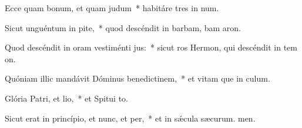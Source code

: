 \item Ecce quam bonum, et quam judum~* habitáre tres in num.
\item Sicut unguéntum in pite,~* quod descéndit in barbam, bam aron.
\item Quod descéndit in oram vestiménti jus:~* sicut ros Hermon, qui descéndit in tem on.
\item Quóniam illic mandávit Dóminus benedictinem,~* et vitam que in culum.
\item Glória Patri, et lio,~* et Spitui to.
\item Sicut erat in princípio, et nunc, et per,~* et in sǽcula sæcurum. men.
